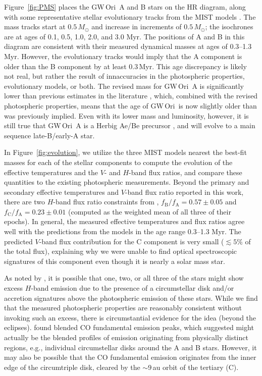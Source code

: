 \documentclass[twocolumn]{aastex61}
\newcommand{\obj}{GW\,Ori}
\begin{document}
Figure~\ref{fig:PMS} places the \obj\ A and B stars on the HR diagram, along with some representative stellar evolutionary tracks from the MIST models \citep{choi16}. The mass tracks start at $0.5\,M_\odot$ and increase in increments of $0.5\,M_\odot$; the isochrones are at ages of 0.1, 0.5, 1.0, 2.0, and 3.0 Myr. The positions of A and B in this diagram are consistent with their measured dynamical masses at ages of 0.3--1.3 Myr. However, the evolutionary tracks would imply that the A component is older than the B component by at least 0.3\,Myr. This age discrepancy is likely not real, but rather the result of innaccuracies in the photospheric properties, evolutionary models, or both. The revised mass for \obj~A is significantly lower than previous estimates in the literature \citep{berger11,fang14}, which, combined with the revised photospheric properties, means that the age of \obj\ is now slightly older than was previously implied. Even with its lower mass and luminosity, however, it is still true that \obj~A is a Herbig Ae/Be precursor \citep[as was also noted by][]{fang14}, and will evolve to a main sequence late-B/early-A star.

In Figure~\ref{fig:evolution}, we utilize the three MIST models nearest the best-fit masses for each of the stellar components to compute the evolution of the effective temperatures and the $V$- and $H$-band flux ratios, and compare these quantities to the existing photospheric measurements. Beyond the primary and secondary effective temperatures and $V$-band flux ratio reported in this work, there are two $H$-band flux ratio constraints from \citet{berger11},  $f_\mathrm{B}/f_\mathrm{A} = 0.57 \pm 0.05$ and $f_\mathrm{C}/f_\mathrm{A} = 0.23 \pm 0.01$ (computed as the weighted mean of all three of their epochs). In general, the measured effective temperatures and flux ratios agree well with the predictions from the models in the age range 0.3--1.3 Myr. The predicted $V$-band flux contribution for the C component is very small ($\lesssim 5\%$ of the total flux), explaining why we were unable to find optical spectroscopic signatures of this component even though it is nearly a solar mass star.

As noted by \citet{berger11}, it is possible that one, two, or all three of the stars might show excess $H$-band emission due to the presence of a circumstellar disk and/or accretion signatures above the photospheric emission of these stars. While we find that the measured photospheric properties are reasonably consistent without invoking such an excess, there is circumstantial evidence for the idea (beyond the eclipses). \citet{najita03} found blended CO fundamental emission peaks, which \citet{bast11} suggested might actually be the blended profiles of emission originating from physically distinct regions, e.g., individual circumstellar disks around the A and B stars. However, it may also be possible that the CO fundamental emission originates from the inner edge of the circumtriple disk, cleared by the $\sim$9\,au orbit of the tertiary (C).
\end{document}
